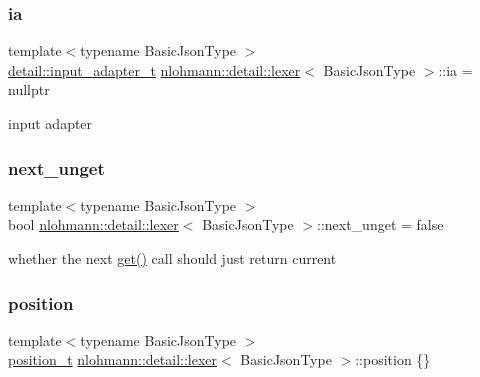 \subsubsection{\texorpdfstring{ia}{ia}}
{\footnotesize\ttfamily template$<$typename Basic\+Json\+Type $>$ \\
\mbox{\hyperlink{namespacenlohmann_1_1detail_ae132f8cd5bb24c5e9b40ad0eafedf1c2}{detail\+::input\+\_\+adapter\+\_\+t}} \mbox{\hyperlink{classnlohmann_1_1detail_1_1lexer}{nlohmann\+::detail\+::lexer}}$<$ Basic\+Json\+Type $>$\+::ia = nullptr\hspace{0.3cm}{\ttfamily [private]}}



input adapter 

\mbox{\label{classnlohmann_1_1detail_1_1lexer_ae8bedb97b907ba6347c5b2f2666ca01f}} 
\subsubsection{\texorpdfstring{next\_unget}{next\_unget}}
{\footnotesize\ttfamily template$<$typename Basic\+Json\+Type $>$ \\
bool \mbox{\hyperlink{classnlohmann_1_1detail_1_1lexer}{nlohmann\+::detail\+::lexer}}$<$ Basic\+Json\+Type $>$\+::next\+\_\+unget = false\hspace{0.3cm}{\ttfamily [private]}}



whether the next \mbox{\hyperlink{classnlohmann_1_1detail_1_1lexer_a901e45a34e1fb1d97ab62350b0c3ef26}{get()}} call should just return current 

\mbox{\label{classnlohmann_1_1detail_1_1lexer_a932a1b4133619f08fc7442b52368385e}} 
\subsubsection{\texorpdfstring{position}{position}}
{\footnotesize\ttfamily template$<$typename Basic\+Json\+Type $>$ \\
\mbox{\hyperlink{structnlohmann_1_1detail_1_1position__t}{position\+\_\+t}} \mbox{\hyperlink{classnlohmann_1_1detail_1_1lexer}{nlohmann\+::detail\+::lexer}}$<$ Basic\+Json\+Type $>$\+::position \{\}\hspace{0.3cm}{\ttfamily [private]}}




